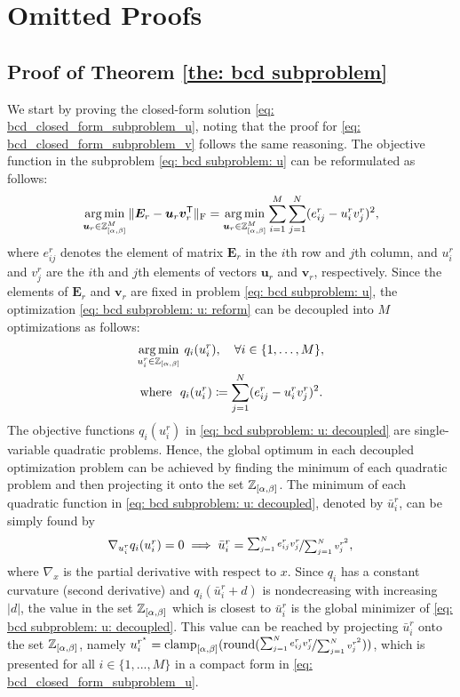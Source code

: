 
\section{Omitted Proofs} \label{app: omitted proofs}

\subsection{Proof of Theorem \ref{the: bcd subproblem}} \label{app: monotonicity proof}
We start by proving the closed-form solution \eqref{eq: bcd_closed_form_subproblem_u}, noting that the proof for \eqref{eq: bcd_closed_form_subproblem_v} follows the same reasoning.
The objective function in the subproblem \eqref{eq: bcd subproblem: u} can be reformulated as follows:
\begin{align}
    \operatorname*{arg\,min}_{\bm{u}_r \in \mathbb Z_{[\alpha,\beta]}^M} \|\bm{E}_r - \bm{u}_r \bm{v}_r^\mathsf{T}\|_{\rm F} 
    = \operatorname*{arg\,min}_{\bm{u}_r \in \mathbb Z_{[\alpha,\beta]}^M}\sum_{i=1}^M \sum_{j=1}^N (e_{ij}^r - u_i^r v_j^r)^2,
    \label{eq: bcd subproblem: u: reform}
\end{align}
where $e_{ij}^r$ denotes the element of matrix $\bm{E}_r$ in the $i$th row and $j$th column, and $u_i^r$ and $v_j^r$ are the $i$th and $j$th elements of vectors $\bm{u}_r$ and $\bm{v}_r$, respectively. Since the elements of $\bm{E}_r$ and $\bm{v}_r$ are fixed in problem \eqref{eq: bcd subproblem: u}, the optimization \eqref{eq: bcd subproblem: u: reform} can be decoupled into $M$ optimizations as follows:
\begin{align}
    \operatorname*{arg\,min}_{u^r_i \in \mathbb Z_{[\alpha,\beta]}} & ~q_i(u_i^r), \quad \forall i\in\{1,\dots,M\}, \nonumber\\
    \textstyle \text{where} ~~ &q_i(u_i^r) \coloneqq \sum_{j=1}^N (e_{ij}^r - u_i^r v_j^r)^2.
    \label{eq: bcd subproblem: u: decoupled}
\end{align}
The objective functions $q_i(u_i^r)$ in \eqref{eq: bcd subproblem: u: decoupled} are single-variable quadratic problems. Hence, the global optimum in each decoupled optimization problem can be achieved by finding the minimum of each quadratic problem and then projecting it onto the set $\mathbb Z_{[\alpha,\beta]}$. The minimum of each quadratic function in \eqref{eq: bcd subproblem: u: decoupled}, denoted by $\bar{u}_i^r$, can be simply found by
\begin{align}
    \textstyle \nabla_{u_i^r} q_i(u_i^r) = 0 \implies \bar{u}_i^r = \nicefrac{\sum_{j=1}^N e_{ij}^r v_j^r}{\sum_{j=1}^N v_j^{r^2}},
    \label{eq: bcd subproblem: u: minimum}
\end{align}
where $\nabla_x$ is the partial derivative with respect to $x$.
Since $q_i$ has a constant curvature (second derivative) and $q_i(\bar{u}_i^r + d)$ is nondecreasing with increasing $|d|$, the value in the set $\mathbb Z_{[\alpha,\beta]}$ which is closest to $\bar{u}_i^r$ is the global minimizer of \eqref{eq: bcd subproblem: u: decoupled}. This value can be reached by projecting $\bar{u}_i^r$ onto the set $\mathbb Z_{[\alpha,\beta]}$, namely $u^{r^\star}_i = \operatorname{clamp}_{[\alpha,\beta]}(\operatorname{round}(\nicefrac{\sum_{j=1}^N e_{ij}^r v_j^r}{\sum_{j=1}^N v_j^{r^2}}))$, which is presented for all $i\in\{1,...,M\}$ in a compact form in \eqref{eq: bcd_closed_form_subproblem_u}.


